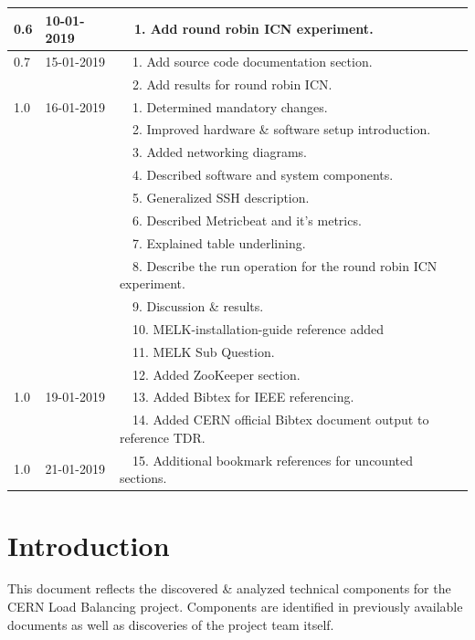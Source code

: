 \documentclass[]{article}
\newcommand{\tabitemNum}{~~}
\begin{document}
\begin{table}[H]
\begin{center}
\begin{tabularx}{\textwidth}{ | l | l | X | }
			\multirow{1}{*}{0.6} & 10-01-2019 & \tabitemNum 1. Add round robin ICN experiment. \\ \hline
			
			\multirow{1}{*}{0.7} & 15-01-2019 & \tabitemNum 1. Add source code documentation section. \\
			& & \tabitemNum 2. Add results for round robin ICN. \\ \hline
			
			\multirow{1}{*}{1.0} & 16-01-2019 & \tabitemNum 1. Determined mandatory changes. \\
			& & \tabitemNum 2. Improved hardware \& software setup introduction. \\
			& & \tabitemNum 3. Added networking diagrams. \\
			& & \tabitemNum 4. Described software and system components. \\
			& & \tabitemNum 5. Generalized SSH description. \\
			& & \tabitemNum 6. Described Metricbeat and it’s metrics. \\
			& & \tabitemNum 7. Explained table underlining. \\
			& & \tabitemNum 8. Describe the run operation for the round robin ICN experiment. \\
			& & \tabitemNum 9. Discussion \& results. \\
			& & \tabitemNum 10. MELK-installation-guide reference added \\
			& & \tabitemNum 11. MELK Sub Question. \\
			& & \tabitemNum 12. Added ZooKeeper section. \\ \hline
			\multirow{1}{*}{1.0} & 19-01-2019 & \tabitemNum 13. Added Bibtex for IEEE referencing. \\
			& & \tabitemNum 14. Added CERN official Bibtex document output to reference TDR. \\ \hline
			\multirow{1}{*}{1.0} & 21-01-2019 & \tabitemNum 15. Additional bookmark references for uncounted sections. \\ \hline
		\end{tabularx}
	\end{center}
\end{table}
\newpage

\section*{Introduction}
This document reflects the discovered \& analyzed technical components for the CERN Load Balancing project. Components are identified in previously available documents as well as discoveries of the project team itself. 
\end{document}
